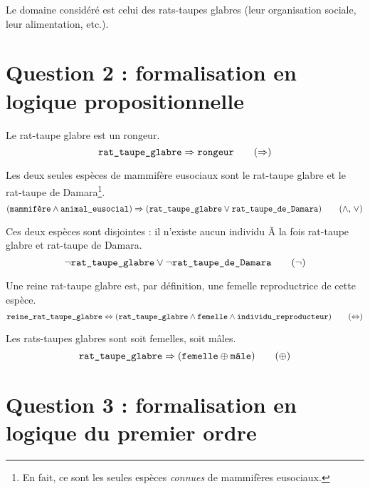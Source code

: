 \documentclass[11pt, a4paper]{article}
\def\fm#1{\text{\texttt{#1}}}
\def\lequiv{\Leftrightarrow}
\def\limplique{\Rightarrow}
\def\louex{\oplus}
\begin{document}
	Le domaine considéré est celui des rats-taupes glabres
	(leur organisation sociale, leur alimentation, etc.).
	
	\section*{Question 2 : formalisation en logique propositionnelle}
	
	\def\animalEusocial{\fm{animal\_eusocial}}
	\def\individuReproducteur{\fm{individu\_reproducteur}}
	\def\femelle{\fm{femelle}}
	\def\male{\fm{mâle}}
	\def\mammifere{\fm{mammifère}}
	\def\rongeur{\fm{rongeur}}
	\def\reineRTG{\fm{reine\_rat\_taupe\_glabre}}
	\def\RTD{\fm{rat\_taupe\_de\_Damara}}
	\def\RTG{\fm{rat\_taupe\_glabre}}
	
	Le rat-taupe glabre est un rongeur.
	\begin{equation*}
	\RTG \limplique \rongeur
	\tag{$\limplique$}
	\end{equation*}
	
	Les deux seules espèces de mammifère eusociaux sont
	le rat-taupe glabre et le rat-taupe de Damara\footnote{%
		En fait, ce sont les seules espèces \emph{connues} de mammifères eusociaux.}.
	\begin{equation*}
	(\mammifere \land \animalEusocial) \limplique (\RTG \lor \RTD)
	\tag{$\land$, $\lor$}
	\end{equation*}
	
	Ces deux espèces sont disjointes : il n'existe aucun individu Ã 
	la fois rat-taupe glabre et rat-taupe de Damara.
	\begin{equation*}
	\lnot\RTG
	\lor
	\lnot\RTD
	\tag{$\lnot$}
	\end{equation*}
	
	Une reine rat-taupe glabre est, par définition, une femelle reproductrice de cette espèce.
	\begin{equation*}
	\reineRTG \lequiv (\RTG \land \femelle \land \individuReproducteur)
	\tag{$\lequiv$}
	\end{equation*}
	
	Les rats-taupes glabres sont soit femelles, soit mâles.
	\begin{equation*}
	\RTG \limplique (\femelle \louex \male)
	\tag{$\louex$}
	\end{equation*}
	
	\section*{Question 3 : formalisation en logique du premier ordre}
	
\end{document}
